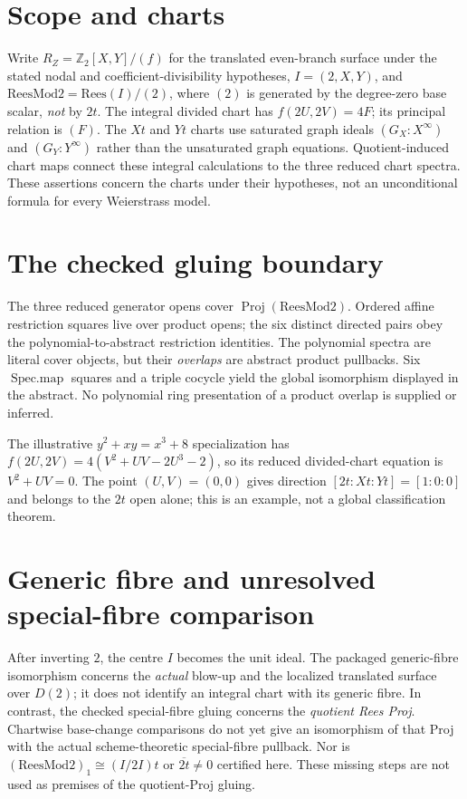 \documentclass[11pt]{article}
\begin{document}
\section{Scope and charts}
Write $R_Z=\mathbb Z_2[X,Y]/(f)$ for the translated even-branch
surface under the stated nodal and coefficient-divisibility
hypotheses, $I=(2,X,Y)$, and
$\mathrm{ReesMod2}=\mathrm{Rees}(I)/(2)$, where $(2)$ is generated
by the degree-zero base scalar, \emph{not} by $2t$.
The integral divided chart has $f(2U,2V)=4F$;
its principal relation is $(F)$.
The $Xt$ and $Yt$ charts use saturated graph ideals
$(G_X:X^\infty)$ and $(G_Y:Y^\infty)$ rather than the
unsaturated graph equations. Quotient-induced chart maps connect
these integral calculations to the three reduced chart spectra.
These assertions concern the charts under their hypotheses,
not an unconditional formula for every Weierstrass model.

\section{The checked gluing boundary}
The three reduced generator opens cover
$\operatorname{Proj}(\mathrm{ReesMod2})$.
Ordered affine restriction squares live over product opens; the
six distinct directed pairs obey the polynomial-to-abstract
restriction identities. The polynomial spectra are literal cover
objects, but their \emph{overlaps} are abstract product pullbacks.
Six $\operatorname{Spec.map}$ squares and a triple cocycle yield the
global isomorphism displayed in the abstract. No polynomial ring
presentation of a product overlap is supplied or inferred.

The illustrative $y^2+xy=x^3+8$ specialization has
$f(2U,2V)=4(V^2+UV-2U^3-2)$, so its reduced divided-chart
equation is $V^2+UV=0$. The point $(U,V)=(0,0)$ gives direction
$[2t:Xt:Yt]=[1:0:0]$ and belongs to the $2t$ open alone;
this is an example, not a global classification theorem.

\section{Generic fibre and unresolved special-fibre comparison}
After inverting $2$, the centre $I$ becomes the unit ideal.
The packaged generic-fibre isomorphism concerns the \emph{actual}
blow-up and the localized translated surface over $D(2)$;
it does not identify an integral chart with its generic fibre.
In contrast, the checked special-fibre gluing concerns the
\emph{quotient Rees Proj}. Chartwise base-change comparisons do not
yet give an isomorphism of that Proj with the actual
scheme-theoretic special-fibre pullback. Nor is
$(\mathrm{ReesMod2})_1\cong(I/2I)t$ or
$\overline{2t}\ne0$ certified here. These missing steps are
not used as premises of the quotient-Proj gluing.
\end{document}

